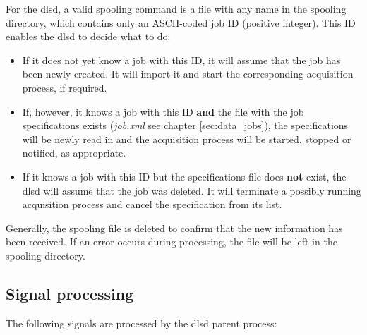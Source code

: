 \documentclass[a4paper,12pt,BCOR6mm,bibtotoc,idxtotoc]{scrbook}
\begin{document}
For the dlsd, a valid spooling command is a file with any name in the spooling directory, which contains only an ASCII-coded job ID (positive integer). This ID enables the dlsd to decide what to do:

\begin{itemize}

\item If it does not yet know a job with this ID, it will assume that the job
has been newly created. It will import it and start the corresponding
acquisition process, if required.

\item If, however, it knows a job with this ID \textbf{and} the file with the
job specifications exists (\textit{job.xml} see chapter
\autoref{sec:data_jobs}), the specifications will be newly read in and the
acquisition process will be started, stopped or notified, as appropriate.

\item If it knows a job with this ID but the specifications file does
\textbf{not} exist, the dlsd will assume that the job was deleted. It will
terminate a possibly running acquisition process and cancel the specification
from its list.

\end{itemize}


Generally, the spooling file is deleted to confirm that the new information has been received. If an error occurs during processing, the file will be left in the spooling directory.


\subsection{Signal processing} \label{sec:dlsd_mother_signals} 

The following signals are processed by the dlsd parent process:
\end{document}
